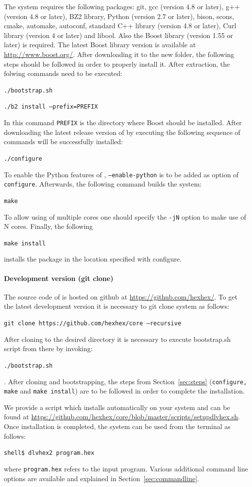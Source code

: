 \documentclass[a4paper, titlepage]{article}
\begin{document}
The system requires the following packages: git, gcc 
(version 4.8 or later), g++ (version 4.8 or later), BZ2 
library, Python (version 2.7 or later), bison, scons, 
cmake, automake, autoconf, standard C++ library (version 
4.8 or later), Curl library (version 4 or later) and 
libool. Also the Boost library (version 1.55 or later) is 
required. The latest Boost library version is available at 
\url{http://www.boost.org/}. After downloading it to the 
new folder, the following steps should be followed in order 
to properly install it. After extraction, the folwing 
commands need to be executed:
\\ \centerline{\texttt{./bootstrap.sh}}
\centerline{\texttt{./b2 install --prefix=PREFIX}} In this 
command \texttt{PREFIX} is the directory where Boost should 
be installed. After downloading the latest release version of \dlvhex{} by 
executing the following sequence of commands \dlvhex{} will 
be successfully installed:
\\ \centerline{\texttt{./configure}} To enable the Python 
features of \dlvhex{}, \texttt{--enable-python} is to be 
added as option of \texttt{configure}. Afterwards, the 
following command builds the system:
\\ \centerline{\texttt{make}} To allow using of multiple 
cores one should specify the \texttt{-jN} option to make 
use of N cores. Finally, the following
\\ \centerline{\texttt{make install}} installs the package 
in the location specified with configure.  
   
\paragraph{Development version (git clone)}
The source code of \dlvhex{} is hosted on github at 
\url{https://github.com/hexhex/}. To get the latest 
development version it is necessary to git clone system as 
follows:
\\ \centerline{\texttt{git clone 
https://github.com/hexhex/core --recursive}} 
After cloning to the desired directory it is necessary to 
execute bootstrap.sh script from there by invoking: \\ 
\centerline{\texttt{./bootstrap.sh}}. 
After cloning and bootstrapping, the steps from 
Section~\ref{sec:steps} (\texttt{configure, make} and 
\texttt{make install}) are to be followed in order to 
complete the installation.

We provide a script which installs \dlvhex{} 
automatically on your system and can be found at 
\url{https://github.com/hexhex/core/blob/master/scripts/setupdlvhex.sh}.
Once installation is completed, the system can be used from 
the terminal as follows:\\ 
\centerline{\texttt{shell\$ dlvhex2 program.hex}} where 
\texttt{program.hex} refers to the input program. Various 
additional command line options are available and explained in Section~\ref{sec:commandline}.    
\end{document}
